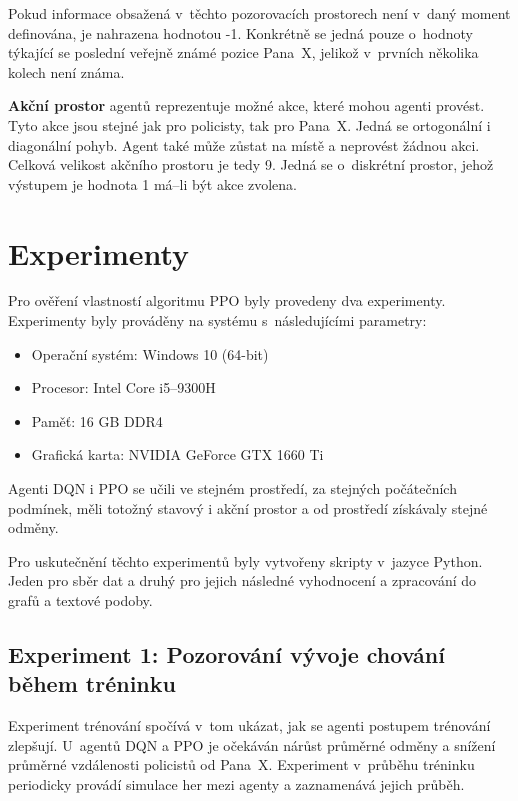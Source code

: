 Pokud informace obsažená v~těchto pozorovacích prostorech není v~daný moment definována, je nahrazena hodnotou -1.
Konkrétně se jedná pouze o~hodnoty týkající se poslední veřejně známé pozice Pana~X, jelikož v~prvních několika kolech není známa.

\bigskip

\textbf{Akční prostor} agentů reprezentuje možné akce, které mohou agenti provést.
Tyto akce jsou stejné jak pro policisty, tak pro Pana~X\@.
Jedná se ortogonální i diagonální pohyb.
Agent také může zůstat na místě a neprovést žádnou akci.
Celková velikost akčního prostoru je tedy 9.
Jedná se o~diskrétní prostor, jehož výstupem je hodnota 1 má--li být akce zvolena.

\chapter{Experimenty}
\label{ch:experimenty}

Pro ověření vlastností algoritmu PPO byly provedeny dva experimenty.
Experimenty byly prováděny na systému s~následujícími parametry:

\begin{itemize}
  \item Operační systém: Windows 10 (64-bit)
  \item Procesor: Intel Core i5--9300H
  \item Paměť: 16 GB DDR4
  \item Grafická karta: NVIDIA GeForce GTX 1660 Ti
\end{itemize}

Agenti DQN i PPO se učili ve stejném prostředí, za stejných počátečních podmínek, měli totožný stavový i akční prostor a od prostředí získávaly stejné odměny.

Pro uskutečnění těchto experimentů byly vytvořeny skripty v~jazyce Python.
Jeden pro sběr dat a druhý pro jejich následné vyhodnocení a zpracování do grafů a textové podoby.

\section{Experiment 1: Pozorování vývoje chování během tréninku}
\label{sec:experiment-1}

Experiment trénování spočívá v~tom ukázat, jak se agenti postupem trénování zlepšují.
U~agentů DQN a PPO je očekáván nárůst průměrné odměny a snížení průměrné vzdálenosti policistů od Pana~X\@.
Experiment v~průběhu tréninku periodicky provádí simulace her mezi agenty a zaznamenává jejich průběh.

